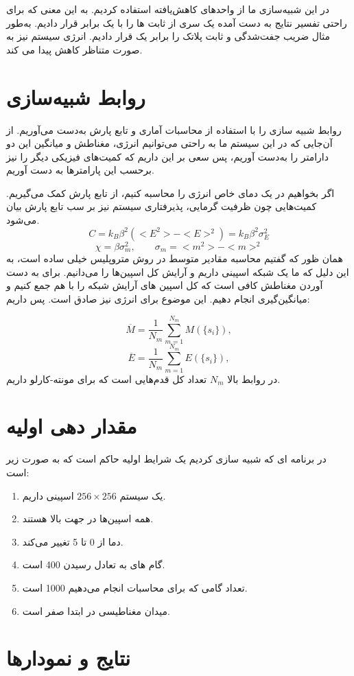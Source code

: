 \documentclass[a4paper,12pt]{article}
\begin{document}
در این شبیه‌سازی ما از واحد‌های کاهش‌یافته استفاده کردیم.
به این معنی که برای راحتی تفسیر نتایج به دست آمده یک سری از
ثابت ها را با یک برابر قرار دادیم.
به‌طور مثال ضریب جفت‌شدگی و ثابت پلاتک را برابر یک قرار دادیم. 
انرژی سیستم نیز به صورت متناظر
کاهش پیدا می کند.
\section{روابط شبیه‌سازی}
روابط شبیه سازی را با استفاده از محاسبات آماری و
تابع پارش به‌دست‌ می‌آوریم. از آن‌جایی که در این سیستم ما به راحتی می‌توانیم
انرژی، مغناطش و میانگین این دو دارامتر را به‌دست آوریم، پس
سعی بر این داریم که کمیت‌های فیزیکی دیگر را نیز بر‌حسب
این پارامترها به دست آوریم.

اگر بخواهیم در یک دمای خاص انرژی را محاسبه کنیم، از تابع پارش کمک می‌گیریم.
کمیت‌هایی چون ظرفیت گرمایی، پذیرفتاری سیستم نیز بر سب تابع پارش
بیان می‌شود.
$$
C=k_B \beta^2(<E^2>-<E>^2)=k_B \beta^2\sigma_E^2
$$
$$
\chi= \beta \sigma^2_m  ,\qquad \sigma_m=<m^2>-<m>^2
$$
همان ظور که گفتیم محاسبه مقادیر متوسط در روش متروپلیس
خیلی ساده است، به این دلیل که ما یک شبکه اسپینی داریم
و آرایش کل اسپین‌ها را می‌دانیم.
برای به دست آوردن مغناطش کافی است که کل 
اسپین های آرایش شبکه را با هم جمع کنیم و میانگین‌گیری انجام دهیم.
این موضوع برای انرژی نیز صادق است. پس داریم:

$$
\overline{M}=\frac{1}{N_m}\sum_{m=1}^{N_m}M(\{s_i\}),
$$
$$
\overline{E}=\frac{1}{N_m}\sum_{m=1}^{N_m}E(\{s_i\}),
$$
در روابط بالا
$N_m$
تعداد کل قدم‌هایی است که برای مونته-کارلو
داریم.
\section{مقدار دهی اولیه}
در برنامه ای که شبیه سازی کردیم یک شرایط اولیه حاکم است که به صورت زیر است:
\begin{enumerate}
 \item یک سیستم
$256\times256$ 
 اسپینی داریم.
 \item همه اسپین‌ها در جهت بالا هستند.
 \item دما از 0 تا 5 تغییر می‌کند.
 \item گام های به تعادل رسیدن 400 است.
 \item تعداد گامی که برای محاسبات انجام می‌دهیم 1000 است.
 \item میدان مغناطیسی در ابتدا صفر است.
\end{enumerate}

\section{نتایج و نمودار‌ها}
\end{document}
